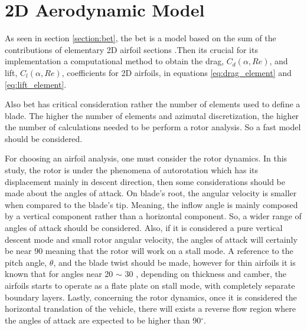 
\section{2D Aerodynamic Model}
\label{section:aero_model}

As seen in section \ref{section:bet}, the \gls{bet} is a model based on the sum of the contributions of elementary 2D airfoil sections .Then its crucial for its implementation a computational method to obtain the drag, $C_d (\alpha, Re) $, and  lift, $C_l (\alpha, Re)$, coefficients for 2D airfoils, in equations \ref{eq:drag_element} and \ref{eq:lift_element}.

Also \gls{bet} has critical consideration rather the number of elements used to define a blade. The higher the number of elements and azimutal discretization, the higher the number of calculations needed to be perform a rotor analysis.  So a fast model should be considered.

For choosing an airfoil analysis, one must consider the rotor dynamics. In this study, the rotor is under the phenomena of autorotation which has its displacement mainly in descent direction, then some considerations should be made about the angles of attack. On blade's root, the angular velocity is smaller when compared to the blade's tip. Meaning, the inflow angle is mainly composed by a vertical component rather than a horizontal component. So, a wider range of angles of attack should be considered. Also, if it is considered a pure vertical descent mode and small rotor angular velocity, the angles of attack will certainly be near 90 \unit{\deg} meaning that the rotor will work on a stall mode. A reference to the pitch angle, $\theta$, and the blade twist should be made, however for thin airfoils it is known that for angles near 20 $\sim$ 30 \unit{\deg}, depending on thickness and camber, the airfoils starts to operate as a flate plate on stall mode, with completely separate boundary layers. Lastly, concerning the rotor dynamics, once it is considered the horizontal translation of the vehicle, there will exists a reverse flow region where the angles of attack are expected to be higher than 90$^{\circ}$.

